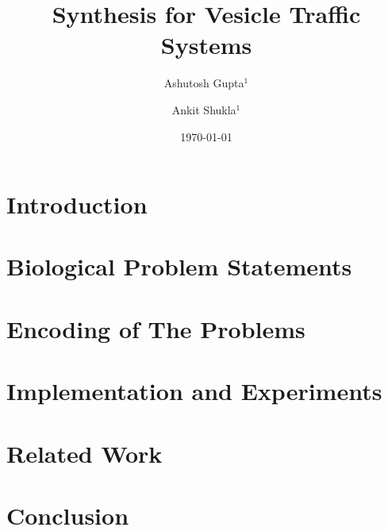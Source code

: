 \documentclass{llncs}
\begin{document}
\title{Synthesis for Vesicle Traffic Systems}

\author{Ashutosh Gupta$^1$ \and Ankit Shukla$^1$}


\date{\today}

\maketitle

\begin{abstract}

\end{abstract}

\section{Introduction}
\label{sec:intro}


\section{Biological Problem Statements}
\label{sec:bio}


\section{Encoding of The Problems}
\label{sec:encoding}


\section{Implementation and Experiments}
\label{sec:experiments}


\section{Related Work}
\label{sec:related}


\section{Conclusion}
\label{sec:conclusion}




\end{document}
